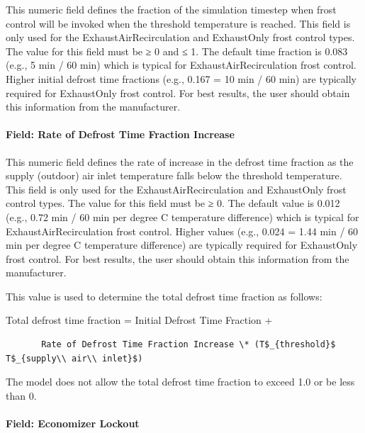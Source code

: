 This numeric field defines the fraction of the simulation timestep when frost control will be invoked when the threshold temperature is reached. This field is only used for the ExhaustAirRecirculation and ExhaustOnly frost control types. The value for this field must be ≥ 0 and ≤ 1. The default time fraction is 0.083 (e.g., 5 min / 60 min) which is typical for ExhaustAirRecirculation frost control. Higher initial defrost time fractions (e.g., 0.167 = 10 min / 60 min) are typically required for ExhaustOnly frost control. For best results, the user should obtain this information from the manufacturer.

\paragraph{Field: Rate of Defrost Time Fraction Increase}\label{field-rate-of-defrost-time-fraction-increase}

This numeric field defines the rate of increase in the defrost time fraction as the supply (outdoor) air inlet temperature falls below the threshold temperature. This field is only used for the ExhaustAirRecirculation and ExhaustOnly frost control types. The value for this field must be ≥ 0. The default value is 0.012 (e.g., 0.72 min / 60 min per degree C temperature difference) which is typical for ExhaustAirRecirculation frost control. Higher values (e.g., 0.024 = 1.44 min / 60 min per degree C temperature difference) are typically required for ExhaustOnly frost control. For best results, the user should obtain this information from the manufacturer.

This value is used to determine the total defrost time fraction as follows:

Total defrost time fraction = Initial Defrost Time Fraction +

\begin{lstlisting}
       Rate of Defrost Time Fraction Increase \* (T$_{threshold}$     T$_{supply\\ air\\ inlet}$)
\end{lstlisting}

The model does not allow the total defrost time fraction to exceed 1.0 or be less than 0.

\paragraph{Field: Economizer Lockout}\label{field-economizer-lockout-1}

